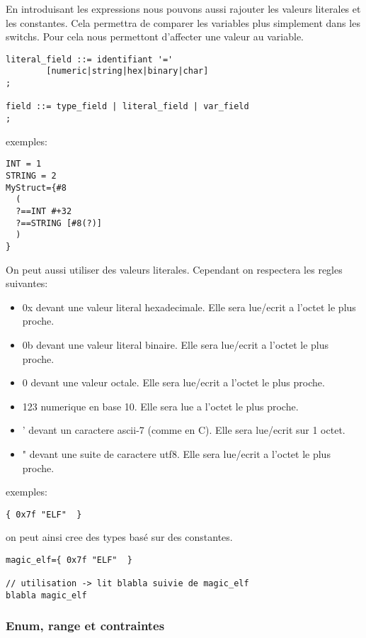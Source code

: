\documentclass[11pt]{report}
\begin{document}
En introduisant les expressions nous pouvons aussi rajouter les valeurs literales et les constantes. 
Cela permettra de comparer les variables plus simplement dans les switchs.
Pour cela nous permettont d'affecter une valeur au variable.

\begin{lstlisting}
literal_field ::= identifiant '=' 
        [numeric|string|hex|binary|char]
;

field ::= type_field | literal_field | var_field
;
\end{lstlisting}

exemples:

\begin{lstlisting}
INT = 1
STRING = 2
MyStruct={#8 
  (
  ?==INT #+32
  ?==STRING [#8(?)]
  )
}
\end{lstlisting}

On peut aussi utiliser des valeurs literales. Cependant on respectera les regles suivantes:

\begin{itemize}
\item 0x devant une valeur literal hexadecimale. Elle sera lue/ecrit a l'octet le plus proche.
\item 0b devant une valeur literal binaire. Elle sera lue/ecrit a l'octet le plus proche.
\item 0 devant une valeur octale. Elle sera lue/ecrit a l'octet le plus proche.
\item 123 numerique en base 10. Elle sera lue a l'octet le plus proche.
\item ' devant un caractere ascii-7 (comme en C). Elle sera lue/ecrit sur 1 octet.
\item " devant une suite de caractere utf8. Elle sera lue/ecrit a l'octet le plus proche.
\end{itemize}

exemples:

\begin{lstlisting}
{ 0x7f "ELF"  }
\end{lstlisting}

on peut ainsi cree des types basé sur des constantes.

\begin{lstlisting}
magic_elf={ 0x7f "ELF"  }

// utilisation -> lit blabla suivie de magic_elf
blabla magic_elf
\end{lstlisting}


\subsubsection{Enum, range et contraintes}
\end{document}
